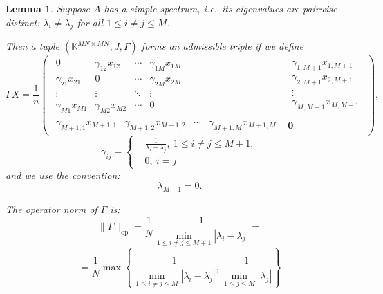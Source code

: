 \documentclass[a4paper]{jpconf}
\newtheorem{nkjpcslem}{Lemma}
\begin{document}
\begin{nkjpcslem}
Suppose \( A \) has a simple spectrum,
    i.e.\ its eigenvalues are pairwise distinct:
    \( \lambda_i\neq\lambda_j \) for all \( 1\leq i{\neq}j \leq M \).

    Then a tuple \( (\mathbb{K}^{{MN}{\times}{MN}}, J, \Gamma) \)
        forms an admissible triple if we define
    \[
        \Gamma X = 
            \frac1n \left(\begin{array}{c|c}
            \begin{matrix}
                0               & \gamma_{12}x_{12} & \cdots & \gamma_{1M}x_{1M} \\
                \gamma_{21}x_{21}  & 0              & \cdots & \gamma_{2M}x_{2M} \\
                \vdots          & \vdots         & \ddots & \vdots & \ \\
                \gamma_{M1}x_{M1}  & \gamma_{M2}x_{M2} & \cdots & 0
            \end{matrix} &
            \begin{matrix}
                \gamma_{1,M+1}x_{1,M+1} \\
                \gamma_{2,M+1}x_{2,M+1} \\
                \vdots \\
                \gamma_{M,M+1}x_{M,M+1}
            \end{matrix} \\ \hline
            \begin{matrix}
                \gamma_{M{+}1,1}x_{M{+}1,1} &
                \gamma_{M{+}1,2}x_{M{+}1,2} &
                \cdots &
                \gamma_{M{+}1,M}x_{M{+}1,M}
            \end{matrix} &
            \mathbf{0}
        \end{array}\right),
    \]
    \[
        \gamma_{ij} = \left\{
            \begin{aligned}
                & \frac{1}{\lambda_i - \lambda_j},\ 1\leq i{\neq}j \leq M{+}1,\\
                & 0,\ i=j
            \end{aligned}
            \right.
    \]
    and we use the convention:
    \[
        \lambda_{M{+}1} = 0.
    \]

    The operator norm of \( \Gamma \) is:
    \[
        \|\Gamma\|_{\mathrm{op}} =
        \frac1N
        \frac{1}{\min\limits_{1\leq i{\neq}j \leq M{+}1}|\lambda_i - \lambda_j|} =
        \]
    \[
        = \frac1N
         \max\left\{
         \frac{1}{
             \min\limits_{1\leq i{\neq}j \leq M }{|\lambda_i - \lambda_j|}},
         \frac{1}{
             \min\limits_{1\leq j \leq M}{|\lambda_j|}}
         \right\}
        \]
\end{nkjpcslem}
\end{document}
